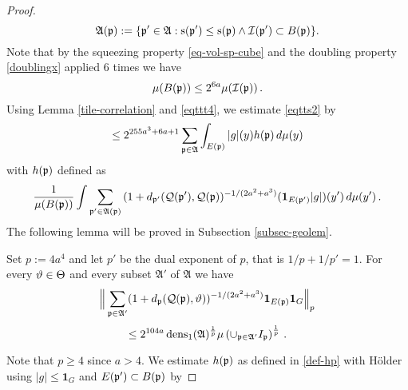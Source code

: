 {\begin{proof}
\begin{equation}
    \label{eq-Dp-definition}
    \mathfrak{A}({\mathfrak p}):=\{{\mathfrak p}'\in\mathfrak{A}: {\mathrm{s}}({\mathfrak p}')\leq {\mathrm{s}}({\mathfrak p}) \land  {\mathcal{I}}({\mathfrak p}') \subset B({\mathfrak p})\}.
\end{equation}
Note that by the squeezing property \eqref{eq-vol-sp-cube}
and the doubling property \eqref{doublingx} applied
$6$ times we have
\begin{equation}\label{eqttt4}
    \mu(B({\mathfrak p}))\le 2^{6a} \mu({\mathcal{I}}({\mathfrak p}))\, .
\end{equation}
Using Lemma \ref{tile-correlation} and \eqref{eqttt4}, we estimate \eqref{eqtts2} by
\begin{equation}\label{eqtts3}
     \le  2^{255a^3+6a+1} \sum_{{\mathfrak p}\in \mathfrak{A}}
    \int_{E({\mathfrak p})}|g|(y) h({\mathfrak p})\, d\mu(y)
\end{equation}
with $h({\mathfrak p})$ defined as
\begin{equation}\label{def-hp}
    \frac 1{\mu(B({\mathfrak p}))}\int \sum_{{\mathfrak p}'\in \mathfrak{A}({\mathfrak p})}
    {(1+d_{{\mathfrak p}'}({\mathcal{Q}}({\mathfrak p}'), {\mathcal{Q}}({\mathfrak p}))^{-1/(2a^2+a^3)}}(\mathbf{1}_{E({\mathfrak p}')}|g|)(y')\, d\mu(y')\,.
\end{equation}
The following lemma will be proved in Subsection \ref{subsec-geolem}.
\begin{lemma}
    \label{antichain-tile-count}
    Set $p:=4a^4$ and let $p'$ be the dual exponent of $p$, that is $1/p+1/p'=1$.
    For  every ${\vartheta}\in{\Theta}$ and every subset $\mathfrak{A}'$ of $\mathfrak{A}$ we have
    \begin{equation}
        \label{eq-antichain-Lp}
        \Big\|\sum_{{\mathfrak p}\in\mathfrak{A}'}(1+d_{{\mathfrak p}}({\mathcal{Q}}({\mathfrak p}), {\vartheta}))^{-1/(2a^2+a^3)}\mathbf{1}_{E({\mathfrak p})}\mathbf{1}_G\Big\|_{p}
    \end{equation}
    \begin{equation}
        \le
        2^{104a}\operatorname{\operatorname{dens}}_1(\mathfrak{A})^{\frac 1p}\mu\left(\cup_{{\mathfrak p}\in\mathfrak{A}'}I_{{\mathfrak p}}\right)^{\frac 1p}\, .
    \end{equation}
\end{lemma}

Note that $p\geq 4$ since $a>4$.
We estimate $h({\mathfrak p})$ as defined in \eqref{def-hp} with H\"older using  $|g|\le \mathbf{1}_G$ and $E({\mathfrak p}')\subset B({\mathfrak p})$ by


\end{proof}}
